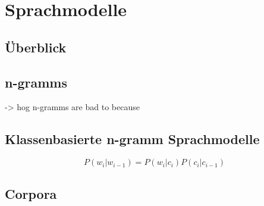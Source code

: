 \section{Sprachmodelle}

    \subsection{Überblick}
    \subsection{n-gramms}
            -> hog n-gramms are bad to because \parencite[470]{cumpatationalLinguistics:classBasedNGramms}
        
	\subsection{Klassenbasierte n-gramm Sprachmodelle}
    \label{sec:brownClustering}
    
    \begin{equation}
   		P(w_i|w_{i-1}) = P(w_i|c_i) P(c_i|c_{i-1})
        \label{eq:wordPropability}
	\end{equation} 
        	
	\subsection{Corpora}
    
    \newpage
    
